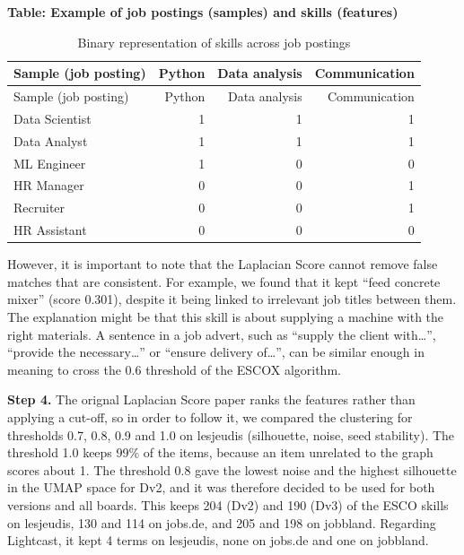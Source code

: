 \documentclass[
  letterpaper,
  DIV=11,
  numbers=noendperiod,
  sfdefaults=false]{scrartcl}
\newcounter{none} %
\begin{document}
\textbf{Table: Example of job postings (samples) and skills (features)}

\begin{longtable}[]{@{}lrrr@{}}
\caption{Binary representation of skills across job
postings}\label{tbl-sample-features}\tabularnewline
\toprule\noalign{}
Sample (job posting) & Python & Data analysis & Communication \\
\midrule\noalign{}
\endfirsthead
\toprule\noalign{}
Sample (job posting) & Python & Data analysis & Communication \\
\midrule\noalign{}
\endhead
\bottomrule\noalign{}
\endlastfoot
Data Scientist & 1 & 1 & 1 \\
Data Analyst & 1 & 1 & 1 \\
ML Engineer & 1 & 0 & 0 \\
HR Manager & 0 & 0 & 1 \\
Recruiter & 0 & 0 & 1 \\
HR Assistant & 0 & 0 & 0 \\
\end{longtable}

However, it is important to note that the Laplacian Score cannot remove
false matches that are consistent. For example, we found that it kept
``feed concrete mixer'' (score 0.301), despite it being linked to
irrelevant job titles between them. The explanation might be that this
skill is about supplying a machine with the right materials. A sentence
in a job advert, such as ``supply the client with\ldots'', ``provide the
necessary\ldots'' or ``ensure delivery of\ldots'', can be similar enough
in meaning to cross the 0.6 threshold of the ESCOX algorithm.

\textbf{Step 4.} The orignal Laplacian Score paper ranks the features
rather than applying a cut-off, so in order to follow it, we compared
the clustering for thresholds 0.7, 0.8, 0.9 and 1.0 on lesjeudis
(silhouette, noise, seed stability). The threshold 1.0 keeps 99\% of the
items, because an item unrelated to the graph scores about 1. The
threshold 0.8 gave the lowest noise and the highest silhouette in the
UMAP space for Dv2, and it was therefore decided to be used for both
versions and all boards. This keeps 204 (Dv2) and 190 (Dv3) of the ESCO
skills on lesjeudis, 130 and 114 on jobs.de, and 205 and 198 on
jobbland. Regarding Lightcast, it kept 4 terms on lesjeudis, none on
jobs.de and one on jobbland.
\end{document}
